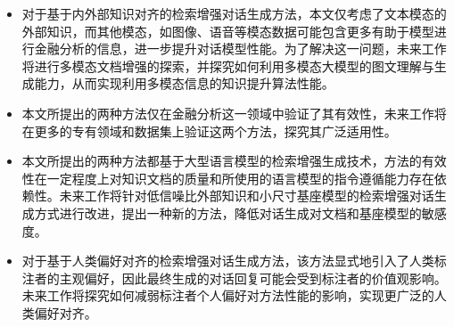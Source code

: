 \begin{itemize}[topsep = 0 pt, itemsep= 0 pt, parsep=0pt, partopsep=0pt, leftmargin=20pt, itemindent=0pt, labelsep=6pt, listparindent=24pt]
	\item 对于基于内外部知识对齐的检索增强对话生成方法，本文仅考虑了文本模态的外部知识，而其他模态，如图像、语音等模态数据可能包含更多有助于模型进行金融分析的信息，进一步提升对话模型性能。为了解决这一问题，未来工作将进行多模态文档增强的探索，并探究如何利用多模态大模型的图文理解与生成能力，从而实现利用多模态信息的知识提升算法性能。
    
    \item 本文所提出的两种方法仅在金融分析这一领域中验证了其有效性，未来工作将在更多的专有领域和数据集上验证这两个方法，探究其广泛适用性。
    
    \item 本文所提出的两种方法都基于大型语言模型的检索增强生成技术，方法的有效性在一定程度上对知识文档的质量和所使用的语言模型的指令遵循能力存在依赖性。未来工作将针对低信噪比外部知识和小尺寸基座模型的检索增强对话生成方式进行改进，提出一种新的方法，降低对话生成对文档和基座模型的敏感度。
    
    \item 对于基于人类偏好对齐的检索增强对话生成方法，该方法显式地引入了人类标注者的主观偏好，因此最终生成的对话回复可能会受到标注者的价值观影响。未来工作将探究如何减弱标注者个人偏好对方法性能的影响，实现更广泛的人类偏好对齐。
\end{itemize}